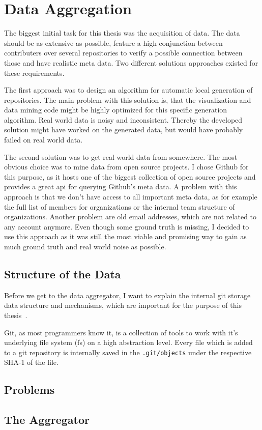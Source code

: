 \chapter{Data Aggregation}

The biggest initial task for this thesis was the acquisition of data.
The data should be as extensive as possible, feature a high conjunction between contributers over several repositories to verify a possible connection between those and have realistic meta data.
Two different solutions approaches existed for these requirements.

The first approach was to design an algorithm for automatic local generation of repositories.
The main problem with this solution is, that the visualization and data mining code might be highly optimized for this specific generation algorithm.
Real world data is noisy and inconsistent. Thereby the developed solution might have worked on the generated data, but would have probably failed on real world data.

The second solution was to get real world data from somewhere. The most obvious choice was to mine data from open source projects.
I chose Github for this purpose, as it hosts one of the biggest collection of open source projects and provides a great \ac{api} for querying Github's meta data.
A problem with this approach is that we don't have access to all important meta data, as for example the full list of members for organizations or the internal team structure of organizations.
Another problem are old email addresses, which are not related to any account anymore.
Even though some ground truth is missing, I decided to use this approach as it was still the most viable and promising way to gain as much ground truth and real world noise as possible.


\section{Structure of the Data}

Before we get to the data aggregator, I want to explain the internal git storage data structure and mechanisms, which are important for the purpose of this thesis~\cite{book:pro-git}.

Git, as most programmers know it, is a collection of tools to work with it's underlying file system (\ac{fs}) on a high abstraction level.
Every file which is added to a git repository is internally saved in the \lstinline{.git/objects} under the respective SHA-1 of the file.


\section{Problems}


\section{The Aggregator}


